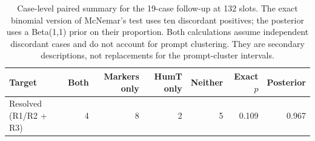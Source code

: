 \begin{table}[htbp]
\centering\small
\caption{Case-level paired summary for the 19-case follow-up at 132 slots. The exact binomial version of McNemar's test uses ten discordant positives; the posterior uses a Beta(1,1) prior on their proportion. Both calculations assume independent discordant cases and do not account for prompt clustering. They are secondary descriptions, not replacements for the prompt-cluster intervals.}
\label{tab:annotation_paired_exact}
\begin{tabular}{lrrrrrr}
\toprule
Target & Both & Markers only & HumT only & Neither & Exact $p$ & Posterior \\
\midrule
Resolved (R1/R2 + R3) & 4 & 8 & 2 & 5 & 0.109 & 0.967 \\
\bottomrule
\end{tabular}
\end{table}
